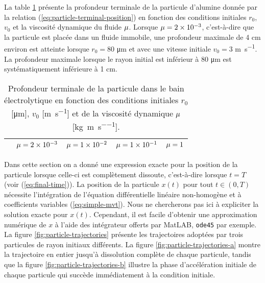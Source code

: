 La table \ref{tab:fall-results} présente la profondeur terminale de
la particule d'alumine donnée par la relation
(\ref{eq:particle-terminal-position}) en fonction des conditions
initiales $r_0$, $v_0$ et la viscosité dynamique du fluide
$\mu$. Lorsque $\mu = \num{2e-3}$,
c'est-à-dire que la particule est placée dans un fluide immobile, une
profondeur maximale de \num{4} \si{\centi\meter} environ est atteinte
lorsque $r_0 = \num{80}$ \si{\micro\meter} et avec une vitesse
initiale $v_0 = \num{3}$ \si{\meter\per\second}. La profondeur
maximale lorsque le rayon initial est inférieur à \num{80}
\si{\micro\meter} est systématiquement inférieure à \num{1}
\si{\centi\meter}.

\begin{table}[h!]
  \begin{center}
    \caption{Profondeur terminale de la particule dans le bain
      électrolytique en fonction des conditions initiales $r_0$
      [\si{\micro\meter}], $v_0$ [\si{\meter\per\second}] et de la
      viscosité dynamique $\mu$
      [\si{\kilo\gram\per\meter\per\second}].}
    \label{tab:fall-results}
    \begin{tabularx}{\textwidth}{@{}lXXXX@{}}
      \toprule
      & $\mu = \num{2e-3}$ & $\mu = \num{1e-2}$ & $\mu = \num{1e-1}$ & $\mu = \num{1}$ \\
      \midrule
      
      \bottomrule
    \end{tabularx}
  \end{center}
\end{table}

Dans cette section on a donné une expression exacte pour la position
de la particule lorsque celle-ci est complètement dissoute,
c'est-à-dire lorsque $t = T$ (voir (\ref{eq:final-time})). La position
de la particule $x(t)$ pour tout $t \in(0, T)$ nécessite l'intégration
de l'équation différentielle linéaire non-homogène et à coefficients
variables (\ref{eq:simple-mvt}). Nous ne chercherons pas ici à
expliciter la solution exacte pour $x(t)$. Cependant, il est facile
d'obtenir une approximation numérique de $x$ à l'aide des intégrateur
offerts par MatLAB\textregistered, \texttt{ode45} par exemple. La
figure \ref{fig:particle-trajectories} présente les trajectoires
adoptées par trois particules de rayon initiaux différents. La figure
\ref{fig:particle-trajectories-a} montre la trajectoire en entier
jusqu'à dissolution complète de chaque particule, tandis que la figure
\ref{fig:particle-trajectories-b} illustre la phase d'accélération
initiale de chaque particule qui succède immédiatement à la condition
initiale.

